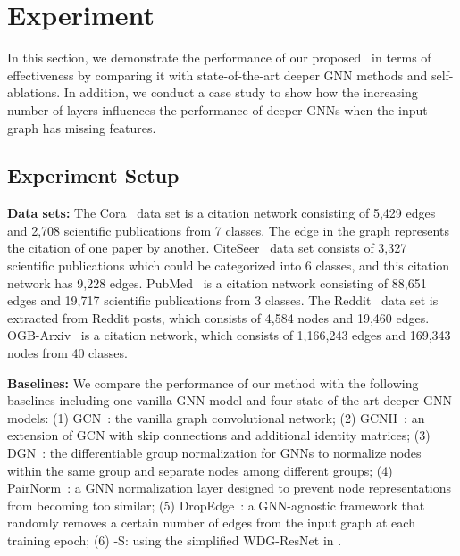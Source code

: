
\section{Experiment}
In this section, we demonstrate the performance of our proposed \name\ in terms of effectiveness by comparing it with state-of-the-art deeper GNN methods and self-ablations.
In addition, we conduct a case study to show how the increasing number of layers influences the performance of deeper GNNs when the input graph has missing features.





\subsection{Experiment Setup}
\textbf{Data sets:} The Cora~\citep{DBLP:conf/icml/LuG03} data set is a citation network consisting of 5,429 edges and 2,708 scientific publications from 7 classes. The edge in the graph represents the citation of one paper by another. CiteSeer~\citep{DBLP:conf/icml/LuG03} data set consists of 3,327 scientific publications which could be categorized into 6 classes, and this citation network has 9,228 edges. PubMed~\citep{namata2012query} is a citation network consisting of 88,651 edges and 19,717 scientific publications from 3 classes. The Reddit~\citep{hamilton2017loyalty} data set is extracted from Reddit posts, which consists of 4,584 nodes and 19,460 edges. OGB-Arxiv~\citep{wang2020microsoft} is a citation network, which consists of 1,166,243 edges and 169,343 nodes from 40 classes.

\noindent\textbf{Baselines:} We compare the performance of our method with the following baselines including one vanilla GNN model and four state-of-the-art deeper GNN models: (1) GCN~\citep{DBLP:conf/iclr/KipfW17}: the vanilla graph convolutional network; (2) GCNII~\citep{DBLP:conf/icml/ChenWHDL20}: an extension of GCN with skip connections and additional identity matrices; (3) DGN~\citep{DBLP:conf/nips/Zhou0LZCH20}: the differentiable group normalization for GNNs to normalize nodes within the same group and separate nodes among different groups; (4) PairNorm~\citep{DBLP:conf/iclr/ZhaoA20}: a GNN normalization layer designed to prevent node representations from becoming too similar; (5) DropEdge~\citep{DBLP:conf/iclr/RongHXH20}: a GNN-agnostic framework that randomly removes a certain number of edges from the input graph at each training epoch; 
(6) 
\name-S: using the simplified WDG-ResNet in \name.


